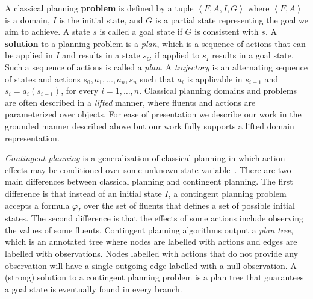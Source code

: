 \documentclass[letterpaper]{article} %
\newcommand{\tuple}[1]{\ensuremath{\left \langle #1 \right \rangle }}
\begin{document}
A classical planning \textbf{problem} is defined by a tuple $\tuple{F,A,I,G}$ 
where $\tuple{F,A}$ is a domain, $I$ is the initial state, and $G$ is a partial state representing  the goal we aim to achieve.  
A state $s$ is called a goal state if $G$ is consistent with $s$. 
A \textbf{solution} to a planning problem is a \emph{plan}, which is a sequence of actions that can be applied in $I$ and results in a state $s_G$ if applied to $s_I$ results in a goal state. 
Such a sequence of actions is called a \emph{plan}. 
A \emph{trajectory} is an alternating sequence of states and actions $s_0,a_1,\ldots,a_n,s_n$ 
such that $a_i$ is applicable in $s_{i-1}$ and $s_i=a_i(s_{i-1})$, for every $i=1,\ldots,n$. 
Classical planning domains and problems are often described in a \emph{lifted} manner, where fluents and actions are parameterized over objects. 
For ease of presentation we describe our work in the grounded manner described above but our work fully supports a lifted domain representation. 

\emph{Contingent planning} is a generalization of classical planning in which action effects may be conditioned over some unknown state variable~\cite{majercik2003contingent,hoffmann2005contingent,albore2009translation,brafman2012multi}. 
There are two main differences between classical planning and contingent planning. 
The first difference is that instead of an initial state $I$, a contingent planning problem accepts a formula $\varphi_I$ over the set of fluents that defines a set of possible initial states. 
The second difference is that the effects of some actions include observing the values of some fluents. 
Contingent planning algorithms output a \emph{plan tree}, which is an annotated tree 
where nodes are labelled with actions and edges are labelled with observations. 
Nodes labelled with actions that do not provide any observation will have a single outgoing edge labelled with a null observation. 
A (strong) solution to a contingent planning problem is a plan tree that guarantees a goal state is eventually found in every branch. 
\end{document}
